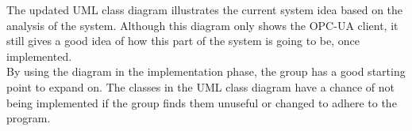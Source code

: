 The updated UML class diagram illustrates the current system idea based on the 
analysis of the system. Although this diagram only shows the 
OPC-UA client, it still gives a good idea of how this part of the system is going
to be, once implemented. \\

By using the diagram in the implementation phase, the group has a good starting 
point to expand on. The classes in the UML class diagram have a chance of not 
being implemented if the group finds them unuseful or changed to adhere to the 
program.